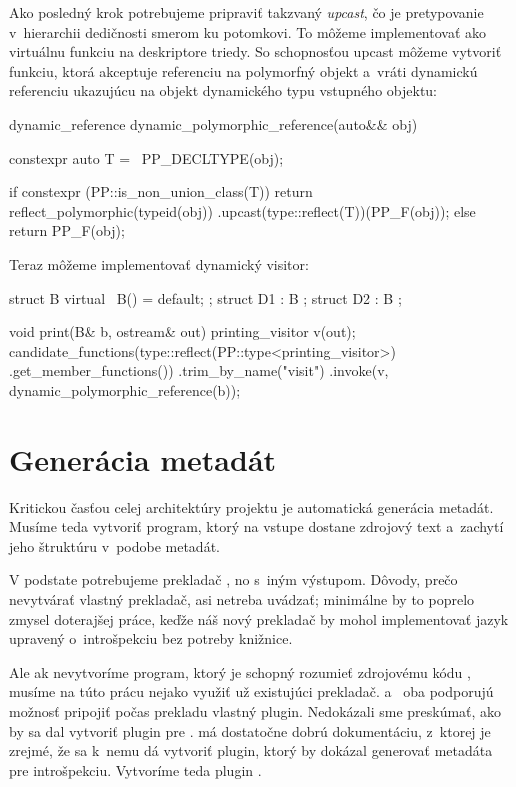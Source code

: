 Ako posledný krok potrebujeme pripraviť takzvaný \emph{upcast}, čo je pretypovanie v~hierarchii dedičnosti smerom ku potomkovi. To môžeme implementovať ako virtuálnu funkciu na deskriptore triedy. So schopnosťou upcast môžeme vytvoriť funkciu, ktorá akceptuje referenciu na polymorfný objekt a~vráti dynamickú referenciu ukazujúcu na objekt dynamického typu vstupného objektu:
\begin{code}
dynamic_reference dynamic_polymorphic_reference(auto&& obj)
{   constexpr auto T = ~PP_DECLTYPE(obj);

    if constexpr (PP::is_non_union_class(T))
        return reflect_polymorphic(typeid(obj))
               .upcast(type::reflect(T))(PP_F(obj));
    else
        return PP_F(obj);
}
\end{code}

Teraz môžeme implementovať dynamický visitor:
\begin{code}
struct B { virtual ~B() = default; };
struct D1 : B {};
struct D2 : B {};

void print(B& b, ostream& out)
{   printing_visitor v(out);
    candidate_functions(type::reflect(PP::type<printing_visitor>)
                        .get_member_functions())
    .trim_by_name("visit")
    .invoke({v, dynamic_polymorphic_reference(b)});
}
\end{code}

\section{Generácia metadát} \label{reflector}

Kritickou časťou celej architektúry projektu je automatická generácia metadát. Musíme teda vytvoriť program, ktorý na vstupe dostane zdrojový text \Cpp{} a~zachytí jeho štruktúru v~podobe metadát.

V podstate potrebujeme prekladač \Cpp{}, no s~iným výstupom. Dôvody, prečo nevytvárať vlastný prekladač, asi netreba uvádzať; minimálne by to poprelo zmysel doterajšej práce, keďže náš nový prekladač by mohol implementovať jazyk \Cpp{} upravený o~introšpekciu bez potreby knižnice.

Ale ak nevytvoríme program, ktorý je schopný rozumieť zdrojovému kódu \Cpp{}, musíme na túto prácu nejako využiť už existujúci prekladač. \Clang{} a~\GCC{} oba podporujú možnosť pripojiť počas prekladu vlastný plugin. Nedokázali sme preskúmať, ako by sa dal vytvoriť plugin pre \GCC{}. \Clang{} má dostatočne dobrú dokumentáciu, z~ktorej je zrejmé, že sa k~nemu dá vytvoriť plugin, ktorý by dokázal generovať metadáta pre introšpekciu. Vytvoríme teda \Clang{} plugin \PPreflector{}.

